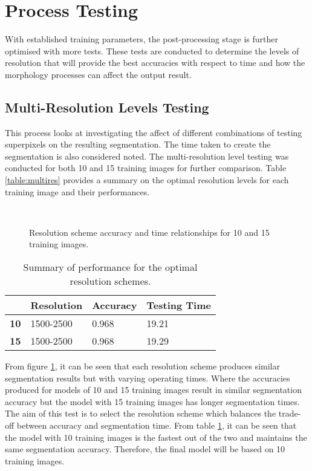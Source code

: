 \section{Process Testing}
\label{sect:processtesting}
With established training parameters, the post-processing stage is further optimised with more tests. These tests are conducted to determine the levels of resolution that will provide the best accuracies with respect to time and how the morphology processes can affect the output result.

\subsection{Multi-Resolution Levels Testing}
This process looks at investigating the affect of different combinations of testing superpixels on the resulting segmentation. The time taken to create the segmentation is also considered noted. The multi-resolution level testing was conducted for both 10 and 15 training images for further comparison. Table \ref{table:multires} provides a summary on the optimal resolution levels for each training image and their performances.

\begin{figure}[H]
    \centering
    \\
    \caption{Resolution scheme accuracy and time relationships for 10 and 15 training images.}%
    \label{reg: multires10}
\end{figure}


\begin{table}[H]
\centering
\caption{Summary of performance for the optimal resolution schemes.}

\begin{tabular}{|l|l|l|l|}
\hline
&	\textbf{Resolution} & \textbf{Accuracy} & \textbf{Testing Time}\\
\hline
\textbf{10} & 1500-2500 & 0.968 & 19.21\\
\hline				    	 			
\textbf{15} & 1500-2500 & 0.968 & 19.29\\	
\hline		    	 
\end{tabular}
\label{table:multiresres}
\end{table}

From figure \ref{reg: multires10}, it can be seen that each resolution scheme produces similar segmentation results but with varying operating times. Where the accuracies produced for models of 10 and 15 training images result in similar segmentation accuracy but the model with 15 training images has longer segmentation times. 
\\[1\baselineskip]
The aim of this test is to select the resolution scheme which balances the trade-off between accuracy and segmentation time. From table \ref{table:multiresres}, it can be seen that the model with 10 training images is the fastest out of the two and maintains the same segmentation accuracy. Therefore, the final model will be based on 10 training images. 

